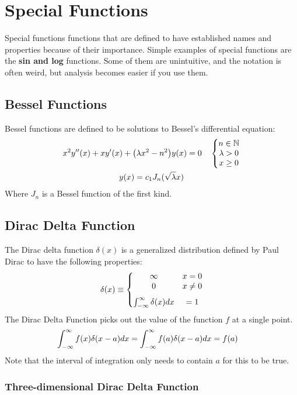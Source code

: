 \section{Special Functions}  
    Special functions functions that are defined to have established names and properties because of their importance. Simple examples of special functions are the {\bf sin and log} functions. Some of them are unintuitive, and the notation is often weird, but analysis becomes easier if you use them. 
    \subsection{Bessel Functions}
        Bessel functions are defined to be solutions to Bessel's differential equation:
        \begin{gather}
            x^2y''(x)+xy'(x)+\qty(\lambda x^2-n^2)y(x)=0\quad\left\{ \begin{gathered} \begin{matrix}  n\in\mathbb{N}\\\lambda>0\\x\geq0 \end{matrix} \end{gathered} \right.
            \\
            y(x)=c_1J_n(\sqrt{\lambda}x)
        \end{gather}
        Where $J_n$ is a Bessel function of the first kind. 
    \subsection{Dirac Delta Function}
        The Dirac delta function $\delta(x)$ is a generalized distribution defined by Paul Dirac to have the following properties:
        \begin{align*}
            \delta(x)\equiv\left\{ \begin{gathered} \begin{matrix} 
            \infty & x=0
            \\
            0 & x\neq 0
            \\[0.25 cm]
            \int_{-\infty}^\infty \delta(x) dx &= 1 \end{matrix} \end{gathered} \right.
        \end{align*}
        The Dirac Delta Function picks out the value of the function $f$ at a single point.
        \begin{align*}
            \int_{-\infty}^{\infty} f(x) \delta(x-a) dx =\int_{-\infty}^{\infty} f(a) \delta(x-a)dx
            &= f(a)
        \end{align*}
        Note that the interval of integration only needs to contain $a$ for this to be true. 
        \subsubsection*{Three-dimensional Dirac Delta Function}
            
